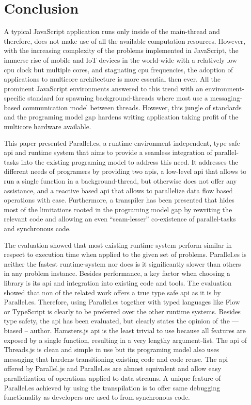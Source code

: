 \section{Conclusion}\label{sec:conclusion}
A typical JavaScript application runs only inside of the main-thread and therefore, does not make use of all the available computation resources. However, with the increasing complexity of the problems implemented in JavaScript, the immerse rise of mobile and IoT devices in the world-wide with a relatively low cpu clock but multiple cores, and stagnating cpu frequencies, the adoption of applications to multicore architecture is more essential then ever. All the prominent JavaScript environments answered to this trend with an environment-specific standard for spawning background-threads where most use a messaging-based communication model between threads. However, this jungle of standards and the programing model gap hardens writing application taking profit of the multicore hardware available. 

This paper presented Parallel.es, a runtime-environment independent, type safe api and runtime system that aims to provide a seamless integration of parallel-tasks into the existing programing model to address this need. It addresses the different needs of programers by providing two apis, a low-level api that allows to run a single function in a background-thread, but otherwise does not offer any assistance, and a reactive based api that allows to parallelize data flow based operations with ease. Furthermore, a  transpiler has been presented that hides most of the limitations rooted in the programing model gap by rewriting the relevant code and allowing an even \enquote{seam-lesser} co-existence of parallel-tasks and synchronous code. 

The evaluation showed that most existing runtime system perform similar in respect to execution time when applied to the given set of problems. Parallel.es is neither the fastest runtime-system nor does is it significantly slower than others in any problem instance. Besides performance, a key factor when choosing a library is its api and integration into existing code and tools. The evaluation showed that non of the related work offers a true type safe api as it is by Parallel.es. Therefore, using Parallel.es together with typed languages like Flow or TypeScript is clearly to be preferred over the other runtime systems. Besides type safety, the api has been evaluated, but clearly states the opinion of the --- biased -- author. Hamsters.js api is the least trivial to use because all features are exposed by a single function, resulting in a very lengthy argument-list. The api of Threads.js is clean and simple in use but its programing model also uses messaging that hardens transitioning existing code and code reuse. The api offered by Parallel.js and Parallel.es are almost equivalent and allow easy parallelization of operations applied to data-streams. A unique feature of Parallel.es achieved by using the transpilation is to offer same debugging functionality as developers are used to from synchronous code. 

